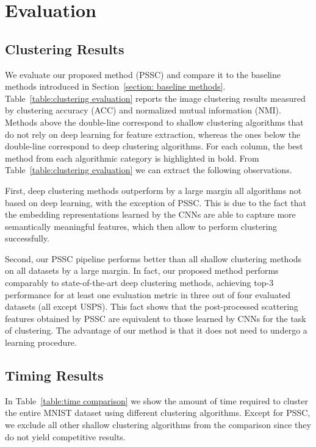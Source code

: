 \documentclass[11pt]{article}
\theoremstyle{definition}
\newcommand{\Table}[1]{Table~\ref{#1}}
\newcommand{\Section}[1]{Section~\ref{#1}}
\begin{document}
\section{Evaluation}\label{sec:evaluation}


\subsection{Clustering Results}

We evaluate our proposed method (PSSC) and compare it to the baseline methods introduced in \Section{section: baseline methods}. \Table{table:clustering evaluation} reports the image clustering results measured by clustering accuracy (ACC) and normalized mutual information (NMI). Methods above the double-line correspond to shallow clustering algorithms that do not rely on deep learning for feature extraction, whereas the ones below the double-line correspond to deep clustering algorithms. For each column, the best method from each algorithmic category is highlighted in bold.
From \Table{table:clustering evaluation} we can extract the following observations.

First, deep clustering methods outperform by a large margin all algorithms not based on deep learning, with the exception of PSSC. This is due to the fact that the embedding representations learned by the CNNs are able to capture more semantically meaningful features, which then allow to perform clustering successfully.

Second, our PSSC pipeline performs better than all shallow clustering methods on all datasets by a large margin. In fact, our proposed method performs comparably to state-of-the-art deep clustering methods, achieving top-3 performance for at least one evaluation metric in three out of four evaluated datasets (all except USPS).
This fact shows that the post-processed scattering features obtained by PSSC are equivalent to those learned by CNNs for the task of clustering. The advantage of our method is that it does not need to undergo a learning procedure.



\subsection{Timing Results}

In \Table{table:time comparison} we show the amount of time required to cluster the entire MNIST dataset using different clustering algorithms. Except for PSSC, we exclude all other shallow clustering algorithms from the comparison since they do not yield competitive results.
\end{document}
